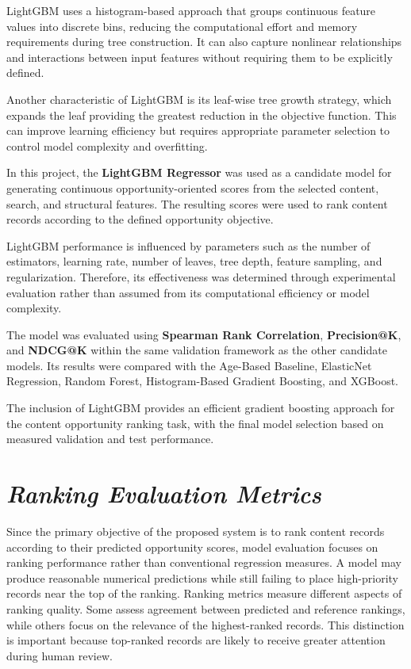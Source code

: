\documentclass[12pt,a4paper]{report}
\begin{document}
LightGBM uses a histogram-based approach that groups continuous feature values into discrete bins, reducing the computational effort and memory requirements during tree construction. It can also capture nonlinear relationships and interactions between input features without requiring them to be explicitly defined.

Another characteristic of LightGBM is its leaf-wise tree growth strategy, which expands the leaf providing the greatest reduction in the objective function. This can improve learning efficiency but requires appropriate parameter selection to control model complexity and overfitting.

In this project, the \textbf{LightGBM Regressor} was used as a candidate model for generating continuous opportunity-oriented scores from the selected content, search, and structural features. The resulting scores were used to rank content records according to the defined opportunity objective.

LightGBM performance is influenced by parameters such as the number of estimators, learning rate, number of leaves, tree depth, feature sampling, and regularization. Therefore, its effectiveness was determined through experimental evaluation rather than assumed from its computational efficiency or model complexity.

The model was evaluated using \textbf{Spearman Rank Correlation}, \textbf{Precision@K}, and \textbf{NDCG@K} within the same validation framework as the other candidate models. Its results were compared with the Age-Based Baseline, ElasticNet Regression, Random Forest, Histogram-Based Gradient Boosting, and XGBoost.

The inclusion of LightGBM provides an efficient gradient boosting approach for the content opportunity ranking task, with the final model selection based on measured validation and test performance.

\section{\textit{Ranking Evaluation Metrics}}

Since the primary objective of the proposed system is to rank content records according to their predicted opportunity scores, model evaluation focuses on ranking performance rather than conventional regression measures. A model may produce reasonable numerical predictions while still failing to place high-priority records near the top of the ranking. Ranking metrics measure different aspects of ranking quality. Some assess agreement between predicted and reference rankings, while others focus on the relevance of the highest-ranked records. This distinction is important because top-ranked records are likely to receive greater attention during human review.
\end{document}
